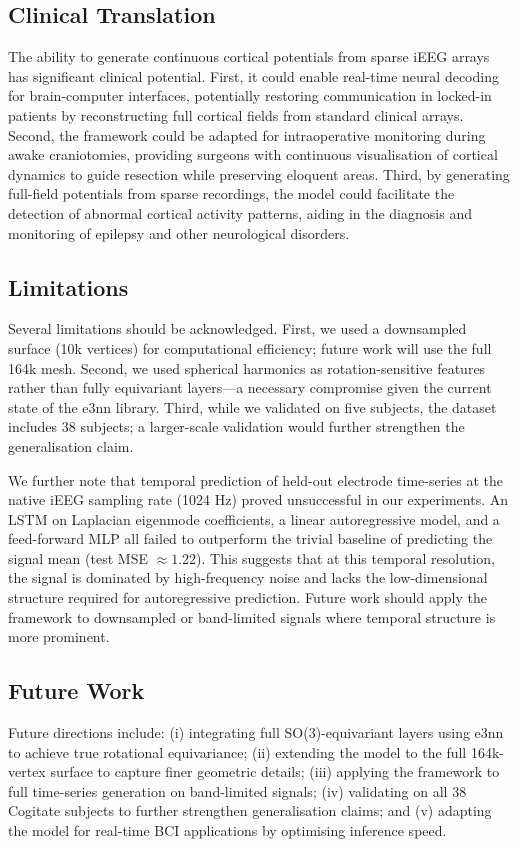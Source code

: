 \documentclass[twocolumn]{article}
\begin{document}
	\subsection*{Clinical Translation}
	The ability to generate continuous cortical potentials from sparse iEEG arrays has significant clinical potential. First, it could enable real-time neural decoding for brain-computer interfaces, potentially restoring communication in locked-in patients by reconstructing full cortical fields from standard clinical arrays. Second, the framework could be adapted for intraoperative monitoring during awake craniotomies, providing surgeons with continuous visualisation of cortical dynamics to guide resection while preserving eloquent areas. Third, by generating full-field potentials from sparse recordings, the model could facilitate the detection of abnormal cortical activity patterns, aiding in the diagnosis and monitoring of epilepsy and other neurological disorders.
	
	\subsection*{Limitations}
	Several limitations should be acknowledged. First, we used a downsampled surface (10k vertices) for computational efficiency; future work will use the full 164k mesh. Second, we used spherical harmonics as rotation-sensitive features rather than fully equivariant layers---a necessary compromise given the current state of the e3nn library. Third, while we validated on five subjects, the dataset includes 38 subjects; a larger-scale validation would further strengthen the generalisation claim.
	
	We further note that temporal prediction of held-out electrode time-series at the native iEEG sampling rate (1024 Hz) proved unsuccessful in our experiments. An LSTM on Laplacian eigenmode coefficients, a linear autoregressive model, and a feed-forward MLP all failed to outperform the trivial baseline of predicting the signal mean (test MSE $\approx 1.22$). This suggests that at this temporal resolution, the signal is dominated by high-frequency noise and lacks the low-dimensional structure required for autoregressive prediction. Future work should apply the framework to downsampled or band-limited signals where temporal structure is more prominent.
	
	\subsection*{Future Work}
	Future directions include: (i) integrating full SO(3)-equivariant layers using e3nn to achieve true rotational equivariance; (ii) extending the model to the full 164k-vertex surface to capture finer geometric details; (iii) applying the framework to full time-series generation on band-limited signals; (iv) validating on all 38 Cogitate subjects to further strengthen generalisation claims; and (v) adapting the model for real-time BCI applications by optimising inference speed.
	
\end{document}
